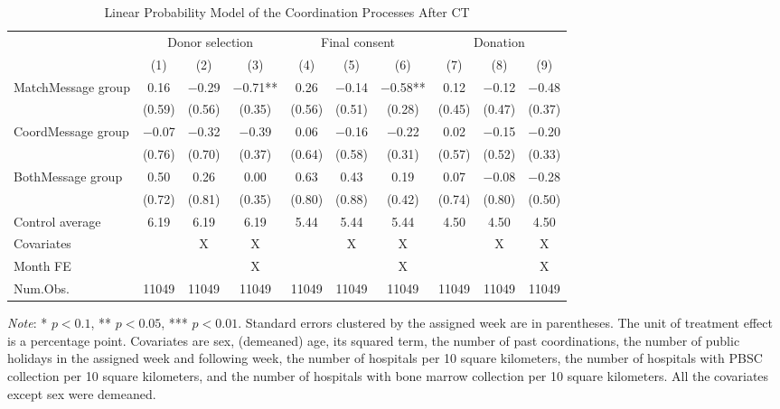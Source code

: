 \documentclass[12pt, a4paper]{article}
\begin{document}
\begin{table}[H]

\caption{\label{tab:lm-coordinate}Linear Probability Model of the Coordination Processes After CT}
\centering
\fontsize{8}{10}\selectfont
\begin{threeparttable}
\begin{tabular}[t]{lccccccccc}
\toprule
\multicolumn{1}{c}{ } & \multicolumn{3}{c}{Donor selection} & \multicolumn{3}{c}{Final consent} & \multicolumn{3}{c}{Donation} \\
\cmidrule(l{3pt}r{3pt}){2-4} \cmidrule(l{3pt}r{3pt}){5-7} \cmidrule(l{3pt}r{3pt}){8-10}
  & (1) & (2) & (3) & (4) & (5) & (6) & (7) & (8) & (9)\\
\midrule
MatchMessage group & \num{0.16} & \num{-0.29} & \num{-0.71}** & \num{0.26} & \num{-0.14} & \num{-0.58}** & \num{0.12} & \num{-0.12} & \num{-0.48}\\
 & (\num{0.59}) & (\num{0.56}) & (\num{0.35}) & (\num{0.56}) & (\num{0.51}) & (\num{0.28}) & (\num{0.45}) & (\num{0.47}) & (\num{0.37})\\
CoordMessage group & \num{-0.07} & \num{-0.32} & \num{-0.39} & \num{0.06} & \num{-0.16} & \num{-0.22} & \num{0.02} & \num{-0.15} & \num{-0.20}\\
 & (\num{0.76}) & (\num{0.70}) & (\num{0.37}) & (\num{0.64}) & (\num{0.58}) & (\num{0.31}) & (\num{0.57}) & (\num{0.52}) & (\num{0.33})\\
BothMessage group & \num{0.50} & \num{0.26} & \num{0.00} & \num{0.63} & \num{0.43} & \num{0.19} & \num{0.07} & \num{-0.08} & \num{-0.28}\\
 & (\num{0.72}) & (\num{0.81}) & (\num{0.35}) & (\num{0.80}) & (\num{0.88}) & (\num{0.42}) & (\num{0.74}) & (\num{0.80}) & (\num{0.50})\\
\midrule
Control average & 6.19 & 6.19 & 6.19 & 5.44 & 5.44 & 5.44 & 4.50 & 4.50 & 4.50\\
Covariates &  & X & X &  & X & X &  & X & X\\
Month FE &  &  & X &  &  & X &  &  & X\\
Num.Obs. & \num{11049} & \num{11049} & \num{11049} & \num{11049} & \num{11049} & \num{11049} & \num{11049} & \num{11049} & \num{11049}\\
\bottomrule
\end{tabular}
\begin{tablenotes}
\item \emph{Note}: * $p < 0.1$, ** $p < 0.05$, *** $p < 0.01$. Standard errors clustered by the assigned week are in parentheses. The unit of treatment effect is a percentage point. Covariates are sex, (demeaned) age, its squared term, the number of past coordinations, the number of public holidays in the assigned week and following week, the number of hospitals per 10 square kilometers, the number of hospitals with PBSC collection per 10 square kilometers, and the number of hospitals with bone marrow collection per 10 square kilometers. All the covariates except sex were demeaned.
\end{tablenotes}
\end{threeparttable}
\end{table}
\end{document}
